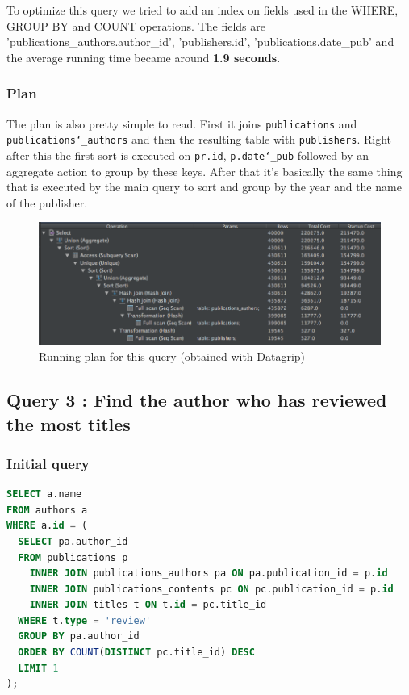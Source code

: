 \documentclass[doubleside, titlepage]{article}
\begin{document}
To optimize this query we tried to add an index on fields used in the WHERE, GROUP BY and COUNT operations. The fields are 'publications_authors.author_id', 'publishers.id', 'publications.date_pub' and the average running time became around \textbf{1.9 seconds}.

\subsubsection{Plan}
The plan is also pretty simple to read. First it joins \texttt{publications} and \texttt{publications\char`_authors} and then the resulting table with \texttt{publishers}. Right after this the first sort is executed on \texttt{pr.id}, \texttt{p.date\char`_pub} followed by an aggregate action to group by these keys. After that it's basically the same thing that is executed by the main query to sort and group by the year and the name of the publisher.

\begin{figure}[!htb]
	\centering
    \includegraphics[scale = 0.5]{./query_analysis/query16}
    \caption{Running plan for this query (obtained with Datagrip)}
\end{figure}


\subsection{Query 3 : Find the author who has reviewed the most titles}

\subsubsection{Initial query}
		\begin{lstlisting}[language=SQL,showspaces=false,basicstyle=\ttfamily,numberstyle=\tiny,commentstyle=\color{gray}]
SELECT a.name
FROM authors a
WHERE a.id = (
  SELECT pa.author_id
  FROM publications p
    INNER JOIN publications_authors pa ON pa.publication_id = p.id
    INNER JOIN publications_contents pc ON pc.publication_id = p.id
    INNER JOIN titles t ON t.id = pc.title_id
  WHERE t.type = 'review'
  GROUP BY pa.author_id
  ORDER BY COUNT(DISTINCT pc.title_id) DESC
  LIMIT 1
);
		\end{lstlisting}
\end{document}
